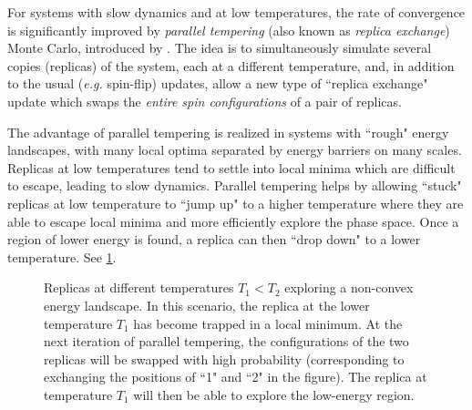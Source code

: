 
For systems with slow dynamics and at low temperatures, the rate of convergence
is significantly improved by \emph{parallel tempering} (also known as
\emph{replica exchange}) Monte Carlo, introduced by
\textcite{hukushima1996exchange}. The idea is to simultaneously simulate
several copies (replicas) of the system, each at a different temperature, and,
in addition to the usual (\emph{e.g.} spin-flip) updates, allow a new type of
``replica exchange" update which swaps the \emph{entire spin configurations} of
a pair of replicas.

The advantage of parallel tempering is realized in systems with ``rough" energy
landscapes, with many local optima separated by energy barriers on many scales.
Replicas at low temperatures tend to settle into local minima which are
difficult to escape, leading to slow dynamics. Parallel tempering helps by
allowing ``stuck" replicas at low temperature to ``jump up" to a higher
temperature where they are able to escape local minima and more efficiently
explore the phase space. Once a region of lower energy is found, a replica can
then ``drop down" to a lower temperature. See \cref{fig:pt-intuition}.

\begin{figure}
  \centering
  
  \caption[Replicas at different temperatures exploring a non-convex energy landscape.]
  {
    Replicas at different temperatures $T_1 < T_2$ exploring a non-convex
    energy landscape. In this scenario, the replica at the lower temperature
    $T_1$ has become trapped in a local minimum. At the next iteration of
    parallel tempering, the configurations of the two replicas will be swapped
    with high probability (corresponding to exchanging the positions of ``1"
    and ``2" in the figure). The replica at temperature $T_1$ will then be able
    to explore the low-energy region.
  }
  \label{fig:pt-intuition}
\end{figure}

